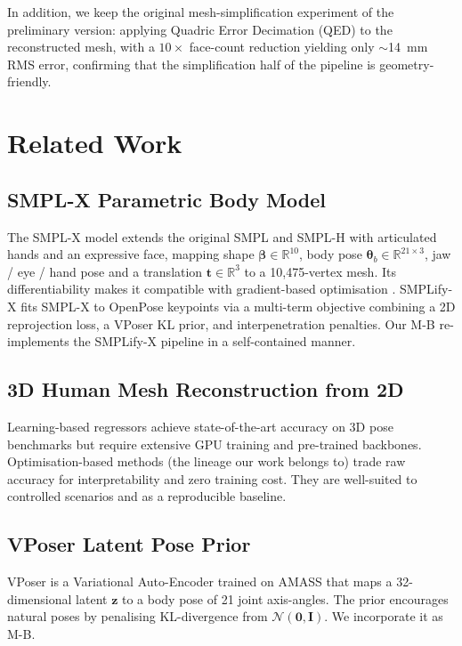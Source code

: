 \documentclass[conference]{IEEEtran}
\begin{document}
In addition, we keep the original mesh-simplification experiment of the preliminary version: applying Quadric Error Decimation (QED) \cite{QED} to the reconstructed mesh, with a $10\times$ face-count reduction yielding only $\sim$14~mm RMS error, confirming that the simplification half of the pipeline is geometry-friendly.

\section{Related Work}
\label{sec:related}

\subsection{SMPL-X Parametric Body Model}
The SMPL-X model \cite{SMPLX} extends the original SMPL \cite{SMPL} and SMPL-H \cite{SMPLH} with articulated hands and an expressive face, mapping shape $\boldsymbol{\beta}\!\in\!\mathbb{R}^{10}$, body pose $\boldsymbol{\theta}_b\!\in\!\mathbb{R}^{21\times 3}$, jaw / eye / hand pose and a translation $\mathbf{t}\!\in\!\mathbb{R}^3$ to a 10,475-vertex mesh. Its differentiability makes it compatible with gradient-based optimisation \cite{Adam}. SMPLify-X \cite{SMPLifyX} fits SMPL-X to OpenPose keypoints via a multi-term objective combining a 2D reprojection loss, a VPoser KL prior, and interpenetration penalties. Our \textsc{M-B} re-implements the SMPLify-X pipeline in a self-contained manner.

\subsection{3D Human Mesh Reconstruction from 2D}
Learning-based regressors \cite{HMR,SPIN,ExPose,PIXIE} achieve state-of-the-art accuracy on 3D pose benchmarks but require extensive GPU training and pre-trained backbones. Optimisation-based methods (the lineage our work belongs to) trade raw accuracy for interpretability and zero training cost. They are well-suited to controlled scenarios and as a reproducible baseline.

\subsection{VPoser Latent Pose Prior}
VPoser \cite{VPoser} is a Variational Auto-Encoder trained on AMASS \cite{AMASS} that maps a 32-dimensional latent $\mathbf{z}$ to a body pose of 21 joint axis-angles. The prior encourages natural poses by penalising KL-divergence from $\mathcal{N}(\mathbf{0},\mathbf{I})$. We incorporate it as \textsc{M-B}.
\end{document}
